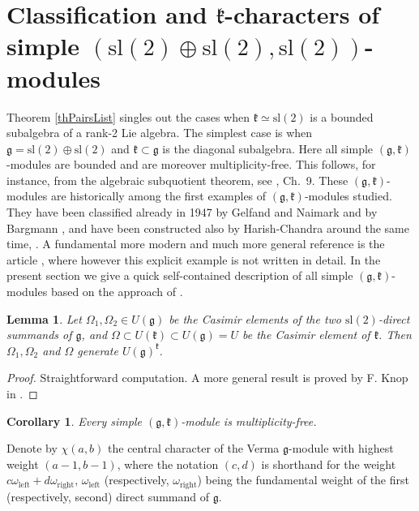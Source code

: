 \documentclass[12pt]{amsart}
\theoremstyle{plain} %
\newtheorem{lemma}[definition]{Lemma}
\newtheorem{corollary}[definition]{Corollary}
\renewcommand{\sl}{\mathrm{sl}}
\newcommand{\kk}{\mathfrak{k}}
\renewcommand{\gg}{\mathfrak{g}}
\newcommand{\refth}[1]{Theorem \ref{#1}}
\begin{document}
\section{Classification and $\kk$-characters of simple $(\sl(2)\oplus\sl(2),\sl(2))$-modules}\label{secKchars}

\refth{thPairsList} singles out the cases when $\kk\simeq\sl(2)$ is a bounded subalgebra of a rank-2 Lie algebra. The simplest case is when $\gg=\sl(2)\oplus\sl(2)$ and $\kk\subset\gg$ is the diagonal subalgebra. Here all simple $(\gg,\kk)$-modules are bounded and are moreover multiplicity-free. This follows, for instance, from
the algebraic subquotient theorem, see \cite{Dix}, Ch.~9. These $(\gg,\kk)$-modules are historically among the first examples of $(\gg,\kk)$-modules studied. They have been classified already in 1947 by Gelfand and Naimark
\cite{GN} and by Bargmann \cite{B}, and have been constructed also by Harish-Chandra
around the same time, \cite{HC}.
A fundamental more modern and much more general
reference is the article \cite{BG}, where however this explicit
example is not written in detail.
In the present section we give a quick self-contained description of
all simple $(\gg,\kk)$-modules based on the approach of \cite{BG}.

\begin{lemma}\label{lmc}
Let $\Omega_1, \Omega_2\in U(\gg)$ be the Casimir elements of the two $\sl(2)$-direct summands of $\gg$, and $\Omega\subset U(\kk)\subset U(\gg)=U$ be the Casimir element of $\kk$. Then $\Omega_1, \Omega_2$ and $\Omega$ generate $U(\gg)^{\kk}$.
\end{lemma}
\begin{proof}
Straightforward computation. A more general result is proved by F. Knop in \cite{Kn1}.
\end{proof}

\begin{corollary}
Every simple $(\gg,\kk)$-module is multiplicity-free.
\end{corollary}

Denote by $\chi(a,b)$ the central character of the Verma $\gg$-module
with highest weight $(a-1,b-1)$, where the notation $(c,d)$ is shorthand for the weight $c\omega_{\mathrm{left}}+d\omega_{\mathrm{right}}$, $\omega_{\mathrm{left}}$ (respectively, $\omega_{\mathrm{right}}$) being the fundamental weight of the first (respectively, second) direct summand of $\gg$.
\end{document}

